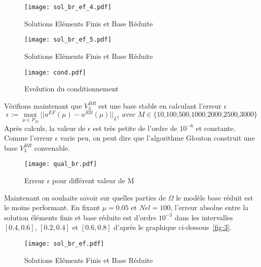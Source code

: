 \documentclass[12pt]{article}
\begin{document}
\begin{figure}[H] 
\begin{center}
\texttt{[image: sol\_br\_ef\_4.pdf]}
\caption[]{Solutions Eléments Finis et Base Réduite  }
\end{center}
\label{fig:1}
\end{figure}

\begin{figure}[H] 
\begin{center}
\texttt{[image: sol\_br\_ef\_5.pdf]}
\caption[]{Solutions Eléments Finis et Base Réduite  }
\end{center}
\label{fig:1}
\end{figure}



\begin{figure}[H] 
\begin{center}
\texttt{[image: cond.pdf]}
\caption[]{Evolution du conditionnement }
\end{center}
\label{fig:1}
\end{figure}



\noindent Vérifions maintenant que $V_{3}^{BR}$ est une base stable en calculant l'erreur $\epsilon$ $$\epsilon := \underset{\mu \in P_{M}} {\max}||u^{EF}(\mu) - u^{RB}(\mu) ||_{L^{2}} \text{ avec } M \in \text{\{10,100,500,1000,2000,2500,3000\} } $$ Après calculs, la valeur de $\epsilon$ est très petite de l'ordre de $10^{-6}$ et constante. Comme l'erreur $\epsilon$ varie peu, on peut dire que l'algorithme Glouton construit une base $V_{3}^{BR}$ convenable.



\begin{figure}[H]
\begin{center}
\texttt{[image: qual\_br.pdf]}
\caption[]{Erreur $\epsilon$ pour différent valeur de M }
\end{center}
\label{fig:2}
\end{figure}

Maintenant on souhaite savoir sur quelles parties de $\Omega$ le modèle base réduit est le moins performant. En fixant $\mu = 0.05$ et $Nel = 100$, l'erreur absolue entre la solution éléments finis et base réduite est d'ordre $10^{-3}$ dans les intervalles $[0.4, 0.6]$, $[0.2, 0.4]$ et $[0.6, 0.8]$ d'après le graphique ci-dessous~\eqref{fig:3}.

\begin{figure}[H]
\begin{center}
\texttt{[image: sol\_br\_ef.pdf]}
\caption[]{Solutions Eléments Finis et Base Réduite  }
\end{center}
\end{figure}
\end{document}
